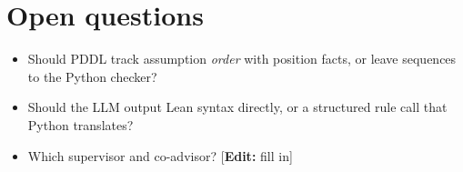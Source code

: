 \documentclass[11pt]{article}
\newcommand{\note}[1]{\textcolor{orange!80!black}{\small[\textbf{Edit:} #1]}}
\begin{document}
\section{Open questions}
\begin{itemize}[leftmargin=*]
  \item Should PDDL track assumption \emph{order} with position facts, or leave sequences to the Python checker?
  \item Should the LLM output Lean syntax directly, or a structured rule call that Python translates?
  \item Which supervisor and co-advisor? \note{fill in}
\end{itemize}



\end{document}

